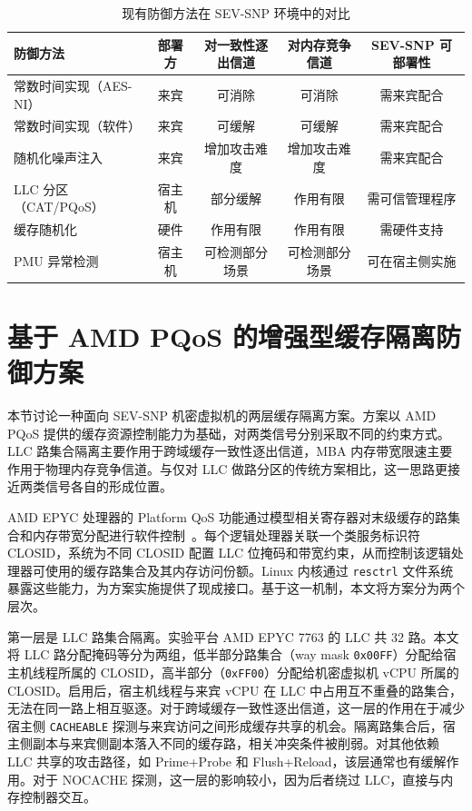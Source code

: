 \begin{table}[htbp]
  \centering
  \caption{现有防御方法在 SEV-SNP 环境中的对比}\label{tab:defense_comparison}
  \begin{tabular}{lcccc}
    \toprule
    防御方法 & 部署方 & 对一致性逐出信道 & 对内存竞争信道 & SEV-SNP 可部署性 \\
    \midrule
    常数时间实现（AES-NI） & 来宾 & 可消除 & 可消除 & 需来宾配合 \\
    常数时间实现（软件）   & 来宾 & 可缓解 & 可缓解 & 需来宾配合 \\
    随机化噪声注入         & 来宾 & 增加攻击难度 & 增加攻击难度 & 需来宾配合 \\
    LLC 分区（CAT/PQoS）  & 宿主机 & 部分缓解 & 作用有限 & 需可信管理程序 \\
    缓存随机化             & 硬件  & 作用有限 & 作用有限 & 需硬件支持 \\
    PMU 异常检测           & 宿主机 & 可检测部分场景 & 可检测部分场景 & 可在宿主侧实施 \\
    \bottomrule
  \end{tabular}
\end{table}

\section{基于 AMD PQoS 的增强型缓存隔离防御方案}
\label{sec:pqos_defense}

本节讨论一种面向 SEV-SNP 机密虚拟机的两层缓存隔离方案。方案以 AMD PQoS 提供的缓存资源控制能力为基础，对两类信号分别采取不同的约束方式。LLC 路集合隔离主要作用于跨域缓存一致性逐出信道，MBA 内存带宽限速主要作用于物理内存竞争信道。与仅对 LLC 做路分区的传统方案相比，这一思路更接近两类信号各自的形成位置。

AMD EPYC 处理器的 Platform QoS 功能通过模型相关寄存器对末级缓存的路集合和内存带宽分配进行软件控制~\cite{amd_pqos_ppr}。每个逻辑处理器关联一个类服务标识符 CLOSID，系统为不同 CLOSID 配置 LLC 位掩码和带宽约束，从而控制该逻辑处理器可使用的缓存路集合及其内存访问份额。Linux 内核通过 \texttt{resctrl} 文件系统暴露这些能力，为方案实施提供了现成接口。基于这一机制，本文将方案分为两个层次。

第一层是 LLC 路集合隔离。实验平台 AMD EPYC 7763 的 LLC 共 32 路。本文将 LLC 路分配掩码等分为两组，低半部分路集合（way mask \texttt{0x00FF}）分配给宿主机线程所属的 CLOSID，高半部分（\texttt{0xFF00}）分配给机密虚拟机 vCPU 所属的 CLOSID。启用后，宿主机线程与来宾 vCPU 在 LLC 中占用互不重叠的路集合，无法在同一路上相互驱逐。对于跨域缓存一致性逐出信道，这一层的作用在于减少宿主侧 \texttt{CACHEABLE} 探测与来宾访问之间形成缓存共享的机会。隔离路集合后，宿主侧副本与来宾侧副本落入不同的缓存路，相关冲突条件被削弱。对其他依赖 LLC 共享的攻击路径，如 Prime+Probe 和 Flush+Reload，该层通常也有缓解作用。对于 NOCACHE 探测，这一层的影响较小，因为后者绕过 LLC，直接与内存控制器交互。

